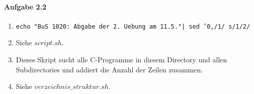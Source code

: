 \documentclass[11pt]{article}
\begin{document}

\paragraph{Aufgabe 2.2}
\begin{enumerate}[label = \alph*)]
\item \texttt{echo "BuS 1020: Abgabe der 2. Uebung am 11.5."| sed '0,/1/ s/1/2/}
\item Siehe $script.sh$.

\item Dieses Skript sucht alle C-Programme in diesem Directory und allen Subdirectories und addiert die Anzahl der Zeilen zusammen.

\item Siehe $verzeichnis\_struktur.sh$.

\end{enumerate}
\end{document}
